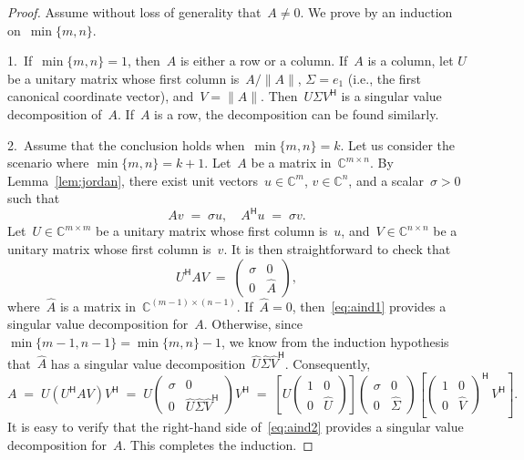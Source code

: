 \documentclass[11pt,a4paper]{article}  %
\numberwithin{equation}{section}
\theoremstyle{definition}
\def\CC{\mathbb{C}}
\newcommand{\hmt}{{\scriptscriptstyle{{\mathsf{H}}}}}
\newcommand{\ie}{{i.e.}}
\begin{document}
\begin{proof}
  Assume without loss of generality that~$A\neq 0$. We prove by an induction on~$\min\{m,n\}$.

  1.~If~$\min\{m, n\} = 1$, then~$A$ is either a row or a column. If~$A$ is a column, let
  $U$ be a unitary matrix whose first column is~$A/\|A\|$, $\Sigma = e_1$ (\ie, the first canonical
  coordinate vector), and~$V = \|A\|$. Then~$U\Sigma V^\hmt$ is a singular value decomposition
  of~$A$. If~$A$ is a row, the decomposition can be found similarly.

  2.~Assume that the conclusion holds when~$\min\{m,n\}= k$. Let us consider the scenario where
  $\min\{m,n\} = k+1$. Let~$A$ be a matrix in~$\CC^{m\times n}$.
  By Lemma~\ref{lem:jordan},
  there exist unit vectors~$u\in\CC^{m}$, $v\in\CC^{n}$, and a scalar~$\sigma>0$ such that
  \begin{equation}
    \label{eq:jordan}
    Av \;=\; \sigma u, \quad A^\hmt u\;=\;\sigma v.
  \end{equation}
  Let~$U\in \CC^{m\times m}$ be a unitary matrix whose first column is~$u$, and~$V\in\CC^{n\times n}$
  be a unitary matrix whose first column is~$v$. It is then straightforward to check that
  \begin{equation}
    \label{eq:aind1}
    U^\hmt A V \;=\;
    \begin{pmatrix}
      \sigma & 0\\
      0 & \hat{A}
    \end{pmatrix},
  \end{equation}
  where~$\hat{A}$ is a matrix in~$\CC^{(m-1)\times (n-1)}$. If~$\hat{A} = 0$, then~\eqref{eq:aind1}
  provides a singular value decomposition for~$A$.
  Otherwise, since~$\min\{m-1, n-1\} = \min\{m,n\}-1$, we
  know from the induction hypothesis that~$\hat{A}$ has a singular value
  decomposition~$\hat{U}\hat{\Sigma} \hat{V}^\hmt$. Consequently,
  \begin{equation}
    \label{eq:aind2}
    A \;=\; U (U^\hmt A V)V^\hmt
    \;=\;
    U
    \begin{pmatrix}
    \sigma & 0\\
    0 & \hat{U}\hat{\Sigma} \hat{V}^\hmt
    \end{pmatrix}
    V^\hmt
  \;=\;
    \left[
  U
  \begin{pmatrix}
    1 & 0\\
    0 & \hat{U}
  \end{pmatrix}
\right]
  \begin{pmatrix}
    \sigma & 0\\
    0 & \hat{\Sigma}
  \end{pmatrix}
  \left[
  \begin{pmatrix}
    1 & 0\\
    0 & \hat{V}
  \end{pmatrix}^{\!\hmt}
  \,V^\hmt
\right].
  \end{equation}
  It is easy to verify that the right-hand side of~\eqref{eq:aind2} provides a singular value
  decomposition for~$A$. This completes the induction.
\end{proof}
\end{document}
